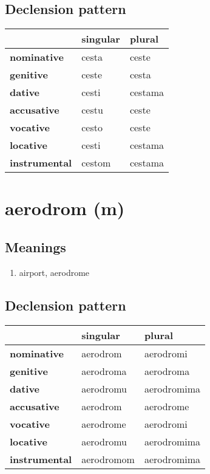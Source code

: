 \subsection*{Declension pattern}
\begin{tabularx}{\linewidth}{Xll}
\toprule
{} & singular &   plural \\
\midrule
\textbf{nominative  } &    cesta &    ceste \\
\textbf{genitive    } &    ceste &    cesta \\
\textbf{dative      } &    cesti &  cestama \\
\textbf{accusative  } &    cestu &    ceste \\
\textbf{vocative    } &    cesto &    ceste \\
\textbf{locative    } &    cesti &  cestama \\
\textbf{instrumental} &   cestom &  cestama \\
\bottomrule
\end{tabularx}

\filbreak
\section{aerodrom (m)}
\subsection*{Meanings}
\begin{enumerate}
\item airport, aerodrome
\end{enumerate}
\subsection*{Declension pattern}
\begin{tabularx}{\linewidth}{Xll}
\toprule
{} &    singular &       plural \\
\midrule
\textbf{nominative  } &    aerodrom &    aerodromi \\
\textbf{genitive    } &   aerodroma &    aerodroma \\
\textbf{dative      } &   aerodromu &  aerodromima \\
\textbf{accusative  } &    aerodrom &    aerodrome \\
\textbf{vocative    } &   aerodrome &    aerodromi \\
\textbf{locative    } &   aerodromu &  aerodromima \\
\textbf{instrumental} &  aerodromom &  aerodromima \\
\bottomrule
\end{tabularx}

